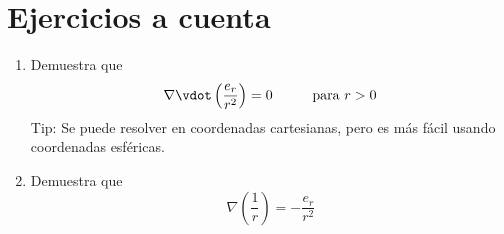 \section*{Ejercicios a cuenta}
\begin{enumerate}[label=\roman*.]
\item Demuestra que 
\[ \nabla \vdot \left( \dfrac{e_{r}}{r^{2}} \right) = 0 \hspace{1cm} \mbox{para } r > 0 \]
Tip: Se puede resolver en coordenadas cartesianas, pero es más fácil usando coordenadas esféricas.
\item Demuestra que 
\[ \nabla \left( \dfrac{1}{r} \right) = - \dfrac{e_{r}}{r^{2}} \]
\end{enumerate}

